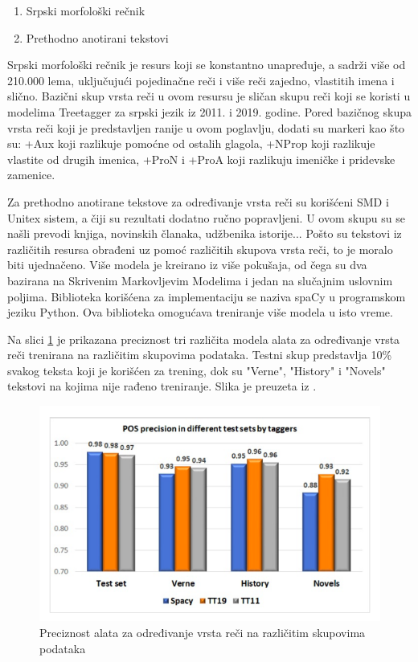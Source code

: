 \documentclass[12pt,oneside]{memoir}
\begin{document}
\begin{enumerate}
\item Srpski morfološki rečnik \cite{srpskifrecnik}
\item Prethodno anotirani tekstovi \cite{tagger}
\end{enumerate}

Srpski morfološki rečnik je resurs koji se konstantno unapređuje, a sadrži više od 210.000 lema, uključujući pojedinačne reči i više reči zajedno, vlastitih imena i slično. Bazični skup vrsta reči u ovom resursu je sličan skupu reči koji se koristi u modelima Treetagger za srpski jezik iz 2011. i 2019. godine.  Pored bazičnog skupa vrsta reči koji je predstavljen ranije u ovom poglavlju, dodati su markeri kao što su: +Aux koji razlikuje pomoćne od ostalih glagola, +NProp koji razlikuje vlastite od drugih imenica, +ProN i +ProA koji razlikuju imeničke i pridevske zamenice.\cite{tagger}

Za prethodno anotirane tekstove za određivanje vrsta reči su korišćeni SMD i Unitex sistem, a čiji su rezultati dodatno ručno popravljeni. U ovom skupu su se našli prevodi knjiga, novinskih članaka, udžbenika istorije... Pošto su tekstovi iz različitih resursa obrađeni uz pomoć različitih skupova vrsta reči, to je moralo biti ujednačeno. 
\newline
\newline
\newline
Više modela je kreirano iz više pokušaja, od čega su dva bazirana na Skrivenim Markovljevim Modelima i jedan na slučajnim uslovnim poljima. Biblioteka korišćena za implementaciju se naziva spaCy u programskom jeziku Python. Ova biblioteka omogućava treniranje više modela u isto vreme. 

Na slici \ref{img:pos_tagger} je prikazana preciznost tri različita modela alata za određivanje vrsta reči trenirana na različitim skupovima podataka.  Testni skup predstavlja 10\% svakog teksta koji je korišćen za trening, dok su "Verne", "History" i "Novels" tekstovi na kojima nije rađeno treniranje. Slika je preuzeta iz \cite{tagger}.

\begin{figure}[h!]
\centering
\includegraphics[width=.7\textwidth]{images/pos_tagger.png}
\caption{Preciznost alata za određivanje vrsta reči na različitim skupovima podataka}
\label{img:pos_tagger}
\end{figure}
\end{document}
